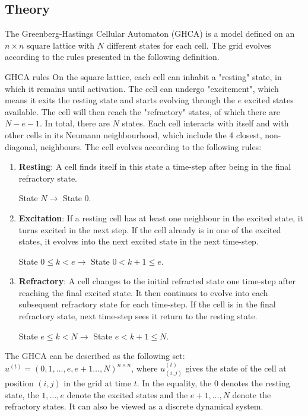 \subsection{Theory}
The Greenberg-Hastings Cellular Automaton (GHCA) is a model defined on an $n\times n$ square lattice with $N$ different states for each cell.
The grid evolves according to the rules presented in the following definition.

\begin{definitionbox}[label=def:GHCArules]{GHCA rules \cite{Lecture}}
On the square lattice, each cell can inhabit a "resting" state, in which it remains until activation.
The cell can undergo "excitement", which means it exits the resting state and starts evolving through the $e$ excited states available.
The cell will then reach the "refractory" states, of which there are $N-e-1$.
In total, there are $N$ states.
Each cell interacts with itself and with other cells in its Neumann neighbourhood, which include the 4 closest, non-diagonal, neighbours.
The cell evolves according to the following rules:
\begin{enumerate}
\item \textbf{Resting}: A cell finds itself in this state a time-step after being in the final refractory state.

State $N \rightarrow$ State $0$.
\item \textbf{Excitation}: If a resting cell has at least one neighbour in the excited state, it turns excited in the next step.
If the cell already is in one of the excited states, it evolves into the next excited state in the next time-step.

State $0 \leq k < e \rightarrow$ State $0 < k+1 \leq e$.
\item \textbf{Refractory}: A cell changes to the initial refracted state one time-step after reaching the final excited state.
It then continues to evolve into each subsequent refractory state for each time-step.
If the cell is in the final refractory state, next time-step sees it return to the resting state.

State $e \leq k < N \rightarrow$ State $e < k+1 \leq N$.
\end{enumerate}
\end{definitionbox}

The GHCA can be described as the following set: $u^{(t)} = (0,1,\dots,e,e+1\dots,N)^{n\times n}$, where $u^{(t)}_{(i,j)}$ gives the state of the cell at position $(i,j)$ in the grid at time $t$.
In the equality, the $0$ denotes the resting state, the $1, \dots , e$ denote the excited states and the $e+1, \dots, N$ denote the refractory states.
It can also be viewed as a discrete dynamical system.


